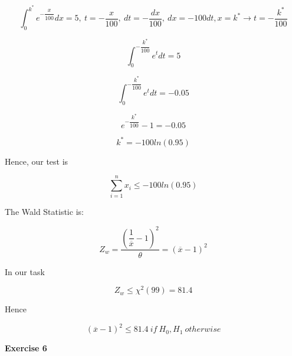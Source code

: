 \documentclass[12pt]{article}
\begin{document}
\begin{list}{()~}{}
\[\int_0^{k^*}e^{-\dfrac{x}{100}}dx=5,\ t=-\dfrac{x}{100},\ dt=-\dfrac{dx}{100},\ dx=-100dt, x=k^* \rightarrow t=-\dfrac{k^*}{100} \]

\[\int _0^{-\dfrac{k^*}{100}}e^t dt=5\]

\[\int _0^{-\dfrac{k^*}{100}}e^t dt =-0.05\]

\[e^{-\dfrac{k^*}{100}}-1=-0.05\]

\[k^*=-100ln\left(0.95\right)\]

Hence, our test is

\[\sum_{i=1}^n x_i \leq -100ln\left(0.95\right)\]

\item
The Wald Statistic is:

\[Z_w=\dfrac{\left(\dfrac{1}{\overline{x}}-1\right)^2}{\theta} = \left({\overline{x}}-1\right)^2\]

In our task 

\[Z_w\leq \chi^2\left(99\right)=81.4\]

Hence

\[\left({\overline{x}}-1\right)^2\leq 81.4\ if\ H_0, H_1\ otherwise\]

\end{list}

\medskip

\textbf{Exercise 6}
\end{document}
